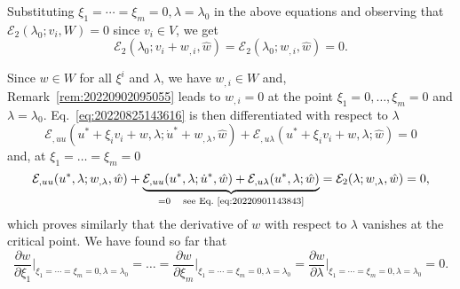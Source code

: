 \documentclass[12pt, final]{scrartcl}
\theoremstyle{definition}
\newcommand{\E}{\mathcal E}
\begin{document}
Substituting $\xi_1 = \cdots = \xi_m = 0, \lambda = \lambda_0$ in the above equations and
observing that $\E_2(\lambda_0; v_i, W) = 0$ since $v_i \in V$, we get
\begin{equation}
\label{eq:20220825150219}
  \E_2(\lambda_0; v_i + w_{,i}, \hat{w}) = \E_2(\lambda_0; w_{,i}, \hat{w}) = 0.
\end{equation}

Since $w \in W$ for all $\xi^i$ and $\lambda$, we have $w_{,i} \in W$ and,
Remark~\ref{rem:20220902095055} leads to $w_{,i} = 0$ at the point
$\xi_1 = 0, \ldots, \xi_m = 0$ and $\lambda = \lambda_0$. Eq.~\eqref{eq:20220825143616} is
then differentiated with respect to  $\lambda$
\begin{equation}
  \label{eq:20220830145945}
  \E_{,uu}(u^\ast + \xi_i v_i + w, \lambda; \dot{u}^\ast + w_{,\lambda}, \hat{w}) + \E_{,u\lambda}(u^\ast + \xi_i v_i + w, \lambda; \hat{w}) = 0
\end{equation}
and, at $\xi_1 = \ldots = \xi_m = 0$
\begin{equation}
  \label{eq:20220830151513}
  \E_{,uu}(u^\ast, \lambda; w_{,\lambda}, \hat{w})
  + \underbrace{\E_{,uu}(u^\ast, \lambda; \dot{u}^\ast, \hat{w}) + \E_{,u\lambda}(u^\ast, \lambda; \hat{w})}_{=0 \quad \text{see Eq.~\eqref{eq:20220901143843}}}
  = \E_2(\lambda; w_{,\lambda}, \hat{w}) = 0,
\end{equation}
which proves similarly that the derivative of $w$ with respect to $\lambda$
vanishes at the critical point. We have found so far that
\begin{equation}
  \frac{∂w}{∂\xi_1} \biggr\rvert_{\xi_1 = \cdots = \xi_m = 0, \lambda = \lambda_0}
  = \ldots =
  \frac{∂w}{∂\xi_m} \biggr\rvert_{\xi_1 = \cdots = \xi_m = 0, \lambda = \lambda_0}
  = \frac{∂w}{∂\lambda} \biggr\rvert_{\xi_1 = \cdots = \xi_m = 0, \lambda = \lambda_0}= 0.
\end{equation}
\end{document}
